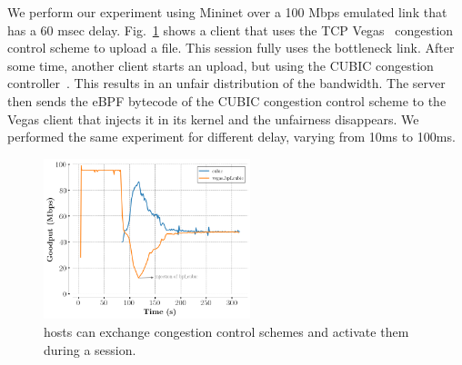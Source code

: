 We perform our experiment using Mininet  over a 100 Mbps emulated link that has a 60 msec delay.
Fig.~\ref{fig:vegasCubic} shows a client that uses the TCP
Vegas~\cite{10.1145/190314.190317} congestion control scheme to upload a file.
This \tcpls session fully uses the bottleneck link. After some time, another
client starts an upload, but using the CUBIC congestion
controller~\cite{rfc8312}. This results in an unfair distribution of the
bandwidth. The server then sends the eBPF bytecode of the CUBIC congestion
control scheme to the \tcp Vegas client that injects it in its kernel and the
unfairness disappears.  We performed the same experiment for different delay,
varying from 10ms to 100ms.

\begin{figure}[!t]
  \begin{center}
    \includegraphics[width=6cm]{pretty_plotify/plots/vegas_cubic.png}
  \end{center}
  \caption{\tcpls hosts can exchange congestion control schemes and activate them during a \tcpls session.}
  \label{fig:vegasCubic}
\end{figure}
